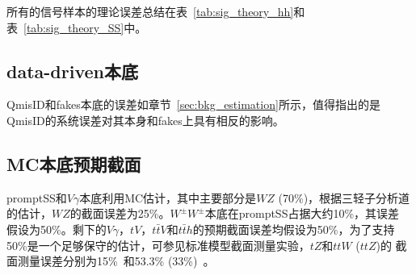 所有的信号样本的理论误差总结在表~\ref{tab:sig_theory_hh}和表~\ref{tab:sig_theory_SS}中。



\subsection{data-driven本底}
QmisID和fakes本底的误差如章节~\ref{sec:bkg_estimation}所示，值得指出的是QmisID的系统误差对其本身和fakes上具有相反的影响。

\subsection{MC本底预期截面}
promptSS和$V\gamma$本底利用MC估计，其中主要部分是$WZ$ (70\%)，根据三轻子分析道的估计，$WZ$的截面误差为25\%。$W^{\pm}W^{\pm}$本底在promptSS占据大约10\%，其误差
假设为50\%。剩下的$V\gamma$，$tV$，$t\bar{t}V$和$t\bar{t}h$的预期截面误差均假设为50\%，为了支持50\%是一个足够保守的估计，可参见标准模型截面测量实验，$tZ$和$ttW$ ($ttZ$)的
截面测量误差分别为15\%~\cite{xsection_WZ}和53.3\% (33\%)~\cite{xsection_ttV}。

